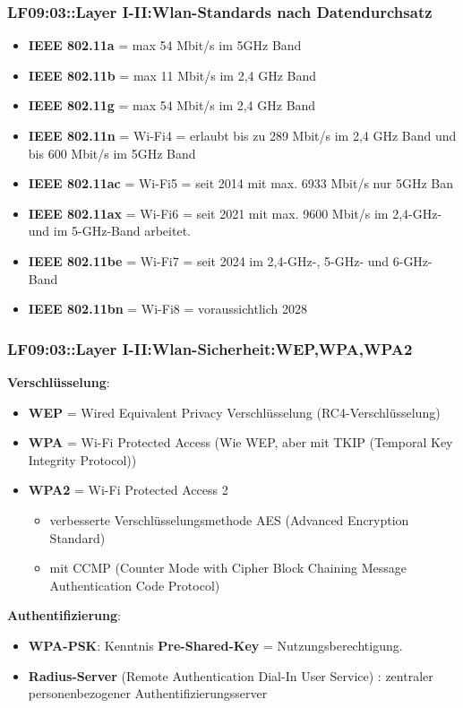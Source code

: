 \begin{frame}  
  \frametitle{LF09:03::Layer I-II:Wlan-Standards nach Datendurchsatz }
  \begin{small}

  \begin{itemize}
    \item \textbf{IEEE 802.11a} = max 54 Mbit/s im 5GHz Band
    \item \textbf{IEEE 802.11b} = max 11 Mbit/s im 2,4 GHz Band
    \item \textbf{IEEE 802.11g} = max 54 Mbit/s im 2,4 GHz Band
    \item \textbf{IEEE 802.11n} = Wi-Fi4 = erlaubt bis zu 289 Mbit/s im 2,4 GHz Band und bis 600 Mbit/s im 5GHz Band
    \item \textbf{IEEE 802.11ac} = Wi-Fi5 = seit 2014 mit max. 6933 Mbit/s nur 5GHz Ban
    \item \textbf{IEEE 802.11ax} = Wi-Fi6 = seit 2021 mit max. 9600 Mbit/s im 2,4-GHz- und im 5-GHz-Band arbeitet. 
    \item \textbf{IEEE 802.11be} = Wi-Fi7 = seit 2024 im 2,4-GHz-, 5-GHz- und 6-GHz-Band
    \item \textbf{IEEE 802.11bn} = Wi-Fi8 = voraussichtlich 2028 
  \end{itemize}
\end{small}

\end{frame}

\begin{frame}  
  \frametitle{LF09:03::Layer I-II:Wlan-Sicherheit:WEP,WPA,WPA2}

   \textbf{Verschlüsselung}:

  \begin{itemize}
    \item \textbf{WEP} = Wired Equivalent Privacy Verschlüsselung (RC4-Verschlüsselung)  
    \item \textbf{WPA} = Wi-Fi Protected Access (Wie WEP, aber mit TKIP (Temporal Key Integrity Protocol))
    \item \textbf{WPA2} = Wi-Fi Protected Access 2 
   \begin{itemize}
      \item verbesserte Verschlüsselungsmethode AES (Advanced Encryption Standard) 
      \item mit CCMP (Counter Mode with Cipher Block Chaining Message Authentication Code Protocol) 
    \end{itemize}  
  \end{itemize}

  \vspace{0.2cm}
  \textbf{Authentifizierung}:

  \begin{itemize}
    \item \textbf{WPA-PSK}:  Kenntnis \textbf{Pre-Shared-Key} =  Nutzungsberechtigung.
    \item \textbf{Radius-Server} (Remote Authentication Dial-In User Service) : zentraler personenbezogener Authentifizierungsserver
  \end{itemize}

\end{frame}

